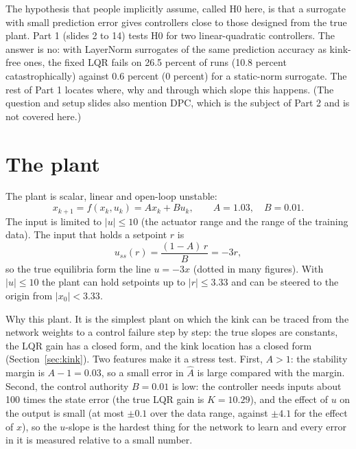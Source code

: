 \documentclass[11pt]{article}
\begin{document}
The hypothesis that people implicitly assume, called H0 here, is that a surrogate with small prediction error gives controllers close to those designed from the true plant. Part 1 (slides 2 to 14) tests H0 for two linear-quadratic controllers. The answer is no: with LayerNorm surrogates of the same prediction accuracy as kink-free ones, the fixed LQR fails on 26.5 percent of runs (10.8 percent catastrophically) against 0.6 percent (0 percent) for a static-norm surrogate. The rest of Part 1 locates where, why and through which slope this happens. (The question and setup slides also mention DPC, which is the subject of Part 2 and is not covered here.)

\section{The plant}\label{sec:plant}

The plant is scalar, linear and open-loop unstable:
\begin{equation}
x_{k+1} = f(x_k,u_k) = A x_k + B u_k, \qquad A = 1.03,\quad B = 0.01 .
\end{equation}
The input is limited to $|u|\le 10$ (the actuator range and the range of the training data). The input that holds a setpoint $r$ is
\begin{equation}
u_{ss}(r) = \frac{(1-A)\,r}{B} = -3r ,
\end{equation}
so the true equilibria form the line $u=-3x$ (dotted in many figures). With $|u|\le 10$ the plant can hold setpoints up to $|r|\le 3.33$ and can be steered to the origin from $|x_0|<3.33$.

Why this plant. It is the simplest plant on which the kink can be traced from the network weights to a control failure step by step: the true slopes are constants, the LQR gain has a closed form, and the kink location has a closed form (Section~\ref{sec:kink}). Two features make it a stress test. First, $A>1$: the stability margin is $A-1=0.03$, so a small error in $\hat A$ is large compared with the margin. Second, the control authority $B=0.01$ is low: the controller needs inputs about 100 times the state error (the true LQR gain is $K=10.29$), and the effect of $u$ on the output is small (at most $\pm 0.1$ over the data range, against $\pm 4.1$ for the effect of $x$), so the $u$-slope is the hardest thing for the network to learn and every error in it is measured relative to a small number.
\end{document}
